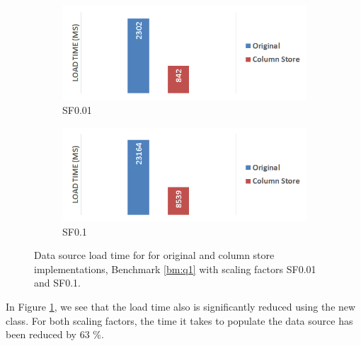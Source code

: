 \begin{figure}
    \centering
    \begin{subfigure}{0.7\textwidth}
        \includegraphics[width=\textwidth]{img/column-store-load-sf001.png}
        \caption{SF0.01}
    \end{subfigure}
    \begin{subfigure}{0.7\textwidth}
        \includegraphics[width=\textwidth]{img/column-store-load-sf010.png}
        \caption{SF0.1}
    \end{subfigure}
    \caption{Data source load time for for original and column store implementations, Benchmark \ref{bm:q1} with scaling factors SF0.01 and SF0.1.}
    \label{fig:column-store-load}
\end{figure}
In Figure \ref{fig:column-store-load}, we see that the load time also is significantly reduced using the new  class. For both scaling factors, the time it takes to populate the data source has been reduced by 63 \%. 


